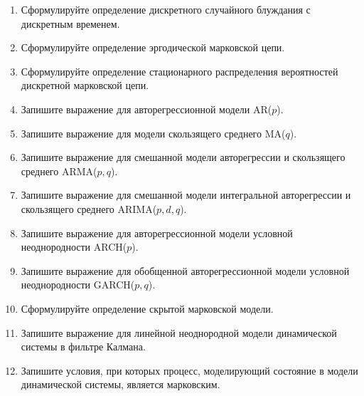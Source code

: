 \documentclass[a4paper,12pt]{extreport}
\renewcommand{\=}[1]{\stackrel{#1}{=}} %
\begin{document}
\begin{enumerate}
	\item Сформулируйте определение дискретного случайного блуждания с дискретным временем.

	\item Сформулируйте определение эргодической марковской цепи.
	\item Сформулируйте определение стационарного распределения вероятностей
	дискретной марковской цепи.

	\item Запишите выражение для авторегрессионной модели AR($p$).
	\item Запишите выражение для модели скользящего среднего MA($q$).
	\item Запишите выражение для смешанной модели авторегрессии и скользящего среднего ARMA($p, q$).
	\item Запишите выражение для смешанной модели интегральной авторегрессии
	и скользящего среднего ARIMA($p, d, q$).
	\item Запишите выражение для авторегрессионной модели условной неоднородности ARCH($p$).
	\item Запишите выражение для обобщенной авторегрессионной модели
	условной неоднородности GARCH($p, q$).

	\item Сформулируйте определение скрытой марковской модели.

	\item Запишите выражение для линейной неоднородной модели динамической системы
	в фильтре Калмана.
	\item Запишите условия, при которых процесс, моделирующий состояние
	в модели динамической системы, является марковским.

\end{enumerate}

\newpage
\end{document}
